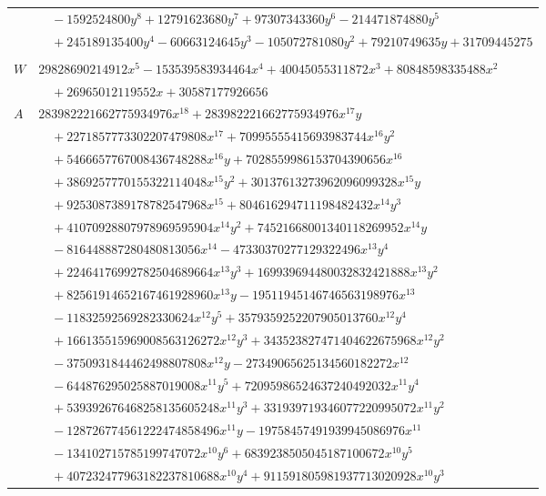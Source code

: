 \documentclass[11pt]{article}
\begin{document}
\begin{longtable}{@{}ll@{}}
 & $\quad -1592524800y^{8}+12791623680y^{7}+97307343360y^{6}-214471874880y^{5}$\\
 & $\quad +245189135400y^{4}-60663124645y^{3}-105072781080y^{2}+79210749635y+31709445275$\\
\addlinespace[3pt]
\multicolumn{2}{@{}l}{$i=104$, $m=10319560704$, neighbours $9,11,23,25,35,51,55,70,75,86,89,106$}\\
$W$ & $29828690214912x^{5}-153539583934464x^{4}+40045055311872x^{3}+80848598335488x^{2}$\\
 & $\quad +26965012119552x+30587177926656$\\
$A$ & $283982221662775934976x^{18}+283982221662775934976x^{17}y$\\
 & $\quad +2271857773302207479808x^{17}+70995555415693983744x^{16}y^{2}$\\
 & $\quad +5466657767008436748288x^{16}y+7028559986153704390656x^{16}$\\
 & $\quad +3869257770155322114048x^{15}y^{2}+30137613273962096099328x^{15}y$\\
 & $\quad +9253087389178782547968x^{15}+804616294711198482432x^{14}y^{3}$\\
 & $\quad +41070928807978969595904x^{14}y^{2}+74521668001340118269952x^{14}y$\\
 & $\quad -816448887280480813056x^{14}-47330370277129322496x^{13}y^{4}$\\
 & $\quad +22464176992782504689664x^{13}y^{3}+169939694480032832421888x^{13}y^{2}$\\
 & $\quad +82561914652167461928960x^{13}y-19511945146746563198976x^{13}$\\
 & $\quad -11832592569282330624x^{12}y^{5}+3579359252207905013760x^{12}y^{4}$\\
 & $\quad +166135515969008563126272x^{12}y^{3}+343523827471404622675968x^{12}y^{2}$\\
 & $\quad -3750931844462498807808x^{12}y-27349065625134560182272x^{12}$\\
 & $\quad -644876295025887019008x^{11}y^{5}+72095986524637240492032x^{11}y^{4}$\\
 & $\quad +539392676468258135605248x^{11}y^{3}+331939719346077220995072x^{11}y^{2}$\\
 & $\quad -128726774561222474858496x^{11}y-19758457491939945086976x^{11}$\\
 & $\quad -134102715785199747072x^{10}y^{6}+6839238505045187100672x^{10}y^{5}$\\
 & $\quad +407232477963182237810688x^{10}y^{4}+911591805981937713020928x^{10}y^{3}$\\

\end{longtable}
\end{document}
